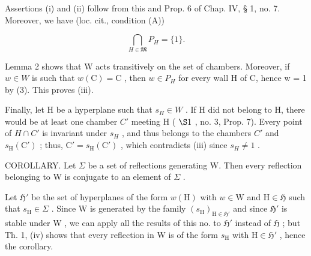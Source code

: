 Assertions (i) and (ii) follow from this and Prop. 6 of Chap. IV, § 1, no. 7. Moreover, we have (loc. cit., condition (A))

\[
\bigcap_ {H \in \mathfrak {M}} P _ {H} = \{1 \}.\tag{3}
\]

Lemma 2 shows that W acts transitively on the set of chambers. Moreover, if \(w \in W\) is such that \(w(\mathrm{C}) = \mathrm{C}\) , then \(w \in P_{H}\) for every wall H of C, hence w = 1 by (3). This proves (iii).

Finally, let H be a hyperplane such that \(s_{H} \in W\) . If H did not belong to H, there would be at least one chamber \(C'\) meeting H ( \(\S1\) , no. 3, Prop. 7). Every point of \(H \cap C'\) is invariant under \(s_{H}\) , and thus belongs to the chambers \(C'\) and \(s_{\mathrm{H}}(\mathrm{C}')\) ; thus, \(\mathrm{C}' = s_{\mathrm{H}}(\mathrm{C}')\) , which contradicts (iii) since \(s_{H} \neq 1\) .

COROLLARY. Let \(\Sigma\) be a set of reflections generating W. Then every reflection belonging to W is conjugate to an element of \(\Sigma\) .

Let \(\mathfrak{H}'\) be the set of hyperplanes of the form \(w(\mathrm{H})\) with \(w \in \mathrm{W}\) and \(\mathrm{H} \in \mathfrak{H}\) such that \(s_{\mathrm{H}} \in \Sigma\) . Since \(\mathrm{W}\) is generated by the family \((s_{\mathrm{H}})_{\mathrm{H} \in \mathfrak{H}'}\) and since \(\mathfrak{H}'\) is stable under \(\mathrm{W}\) , we can apply all the results of this no. to \(\mathfrak{H}'\) instead of \(\mathfrak{H}\) ; but Th. 1, (iv) shows that every reflection in \(\mathrm{W}\) is of the form \(s_{\mathrm{H}}\) with \(\mathrm{H} \in \mathfrak{H}'\) , hence the corollary.

